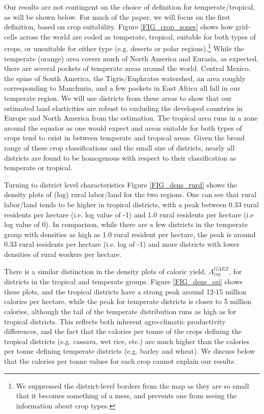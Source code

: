 \documentclass[11pt]{article}
\begin{document}
\vspace{.5cm} 
Our results are not contingent on the choice of definition for temperate/tropical, as will be shown below. For much of the paper, we will focus on the first definition, based on crop suitability. Figure \ref{FIG_crop_zones} shows how grid-cells across the world are coded as temperate, tropical, suitable for both types of crops, or unsuitable for either type (e.g. deserts or polar regions).\footnote{We suppressed the district-level borders from the map as they are so small that it becomes something of a mess, and prevents one from seeing the information about crop types.} While the temperate (orange) area covers much of North America and Eurasia, as expected, there are several pockets of temperate areas around the world. Central Mexico, the spine of South America, the Tigris/Euphrates watershed, an area roughly corresponding to Manchuria, and a few pockets in East Africa all fall in our temperate region. We will use districts from these areas to show that our estimated land elasticities are robust to excluding the developed countries in Europe and North America from the estimation. The tropical area runs in a zone around the equator as one would expect and areas suitable for both types of crops tend to exist in between temperate and tropical areas. Given the broad range of these crop classifications and the small size of districts, nearly all districts are found to be homogenous with respect to their classification as temperate or tropical.

Turning to district level characteristics Figure \ref{FIG_dens_rurd} shows the density plots of (log) rural labor/land for the two regions. One can see that rural labor/land tends to be higher in tropical districts, with a peak between 0.33 rural residents per hectare (i.e. log value of -1) and 1.0 rural residents per hectare (i.e log value of 0). In comparison, while there are a few districts in the temperate group with densities as high as 1.0 rural resident per hectare, the peak is around 0.33 rural residents per hectare (i.e. log of -1) and more districts with lower densities of rural workers per hectare. 

There is a similar distinction in the density plots of caloric yield, $A_{isg}^{GAEZ}$, for districts in the tropical and temperate groups. Figure \ref{FIG_dens_csi} shows these plots, and the tropical districts have a strong peak around 12-15 million calories per hectare, while the peak for temperate districts is closer to 5 million calories, although the tail of the temperate distribution runs as high as for tropical districts. This reflects both inherent agro-climatic productivity differences, and the fact that the calories per tonne of the crops defining the tropical districts (e.g. cassava, wet rice, etc.) are much higher than the calories per tonne defining temperate districts (e.g. barley and wheat). We discuss below that the calories per tonne values for each crop cannot explain our results.
\end{document}
